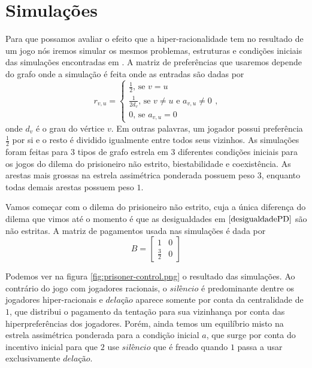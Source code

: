 \chapter{Simulações}

Para que possamos avaliar o efeito que a hiper-racionalidade tem no resultado de um jogo nós iremos simular os mesmos problemas, estruturas e condições iniciais das simulações encontradas em \cite{madeo2015}. A matriz de preferências que usaremos depende do grafo onde a simulação é feita onde as entradas são dadas por
\begin{equation}
    \label{prefComparativo}
    r_{v,u} = \left\{\begin{matrix}
                \frac{1}{2} \text{, se } v=u\\ 
                \frac{1}{2d_v} \text{, se } v\neq u \text{ e } a_{v,u}\neq 0 \\
                 0 \text{, se } a_{v,u}=0
                \end{matrix}\right.,
\end{equation}
onde $d_v$ é o grau do vértice $v$. Em outras palavras, um jogador possui preferência $\frac{1}{2}$ por si e o resto é dividido igualmente entre todos seus vizinhos. As simulações foram feitas para $3$ tipos de grafo estrela em $3$ diferentes condições iniciais para os jogos do dilema do prisioneiro não estrito, biestabilidade e coexistência. As arestas mais grossas na estrela assimétrica ponderada possuem peso $3$, enquanto todas demais arestas possuem peso $1$. 

Vamos começar com o dilema do prisioneiro não estrito, cuja a única diferença do dilema que vimos até o momento é que as desigualdades em $\eqref{desigualdadePD}$ são não estritas. A matriz de pagamentos usada nas simulações é dada por
\begin{equation}
    \label{pagtoPDComparativo}
    B=
    \begin{bmatrix}
        1 & 0\\ 
        \frac{3}{2} & 0 
    \end{bmatrix}
\end{equation}

Podemos ver na figura \ref{fig:prisoner-control.png} o resultado das simulações. Ao contrário do jogo com jogadores racionais, o $\textit{silêncio}$ é predominante dentre os jogadores hiper-racionais e $\textit{delação}$ aparece somente por conta da centralidade de $1$, que distribui o pagamento da tentação para sua vizinhança por conta das hiperpreferências dos jogadores. Porém, ainda temos um equilíbrio misto na estrela assimétrica ponderada para a condição inicial $a$, que surge por conta do incentivo inicial para que $2$ use $\textit{silêncio}$ que é freado quando $1$ passa a usar exclusivamente $\textit{delação}$.

